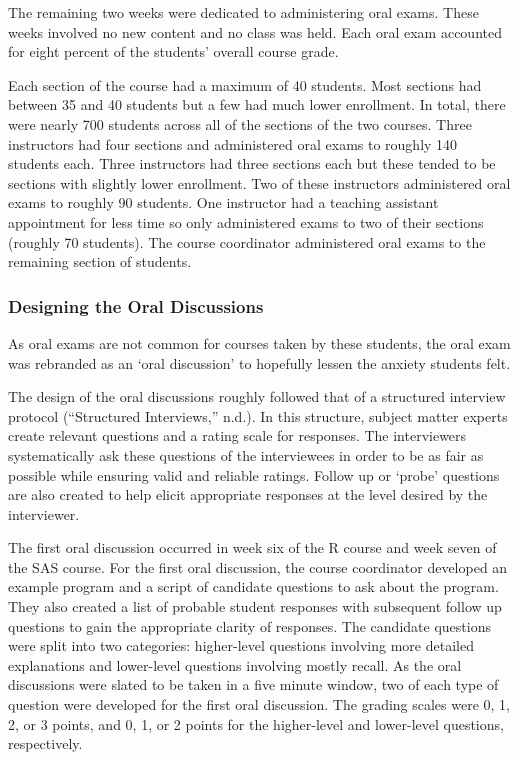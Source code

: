 \documentclass[
  letterpaper,
  DIV=11,
  numbers=noendperiod]{scrartcl}
\begin{document}
The remaining two weeks were dedicated to administering oral exams.
These weeks involved no new content and no class was held. Each oral
exam accounted for eight percent of the students' overall course grade.

Each section of the course had a maximum of 40 students. Most sections
had between 35 and 40 students but a few had much lower enrollment. In
total, there were nearly 700 students across all of the sections of the
two courses. Three instructors had four sections and administered oral
exams to roughly 140 students each. Three instructors had three sections
each but these tended to be sections with slightly lower enrollment. Two
of these instructors administered oral exams to roughly 90 students. One
instructor had a teaching assistant appointment for less time so only
administered exams to two of their sections (roughly 70 students). The
course coordinator administered oral exams to the remaining section of
students.

\hypertarget{designing-the-oral-discussions}{%
\subsubsection{Designing the Oral
Discussions}\label{designing-the-oral-discussions}}

As oral exams are not common for courses taken by these students, the
oral exam was rebranded as an `oral discussion' to hopefully lessen the
anxiety students felt.

The design of the oral discussions roughly followed that of a structured
interview protocol ({``Structured Interviews,''} n.d.). In this
structure, subject matter experts create relevant questions and a rating
scale for responses. The interviewers systematically ask these questions
of the interviewees in order to be as fair as possible while ensuring
valid and reliable ratings. Follow up or `probe' questions are also
created to help elicit appropriate responses at the level desired by the
interviewer.

The first oral discussion occurred in week six of the R course and week
seven of the SAS course. For the first oral discussion, the course
coordinator developed an example program and a script of candidate
questions to ask about the program. They also created a list of probable
student responses with subsequent follow up questions to gain the
appropriate clarity of responses. The candidate questions were split
into two categories: higher-level questions involving more detailed
explanations and lower-level questions involving mostly recall. As the
oral discussions were slated to be taken in a five minute window, two of
each type of question were developed for the first oral discussion. The
grading scales were 0, 1, 2, or 3 points, and 0, 1, or 2 points for the
higher-level and lower-level questions, respectively.
\end{document}
